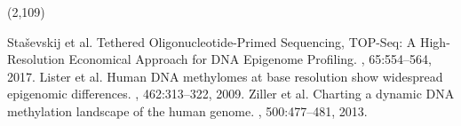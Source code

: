 \documentclass[a0,50pt]{a0poster}
\begin{document}
    \begin{textblock}{22}(2,109)
        \renewcommand{\section}[2]{}
        \begin{thebibliography}{}
                Staševskij et al.
                \newblock Tethered Oligonucleotide-Primed Sequencing, TOP-Seq: A High-Resolution Economical Approach for DNA Epigenome Profiling.
                , 65:554--564, 2017.
                Lister et al.
                \newblock Human DNA methylomes at base resolution show widespread epigenomic differences.
                , 462:313--322, 2009.
                Ziller et al.
                \newblock Charting a dynamic DNA methylation landscape of the human genome.
                , 500:477--481, 2013.

        \end{thebibliography}
    \end{textblock}
\end{document}
